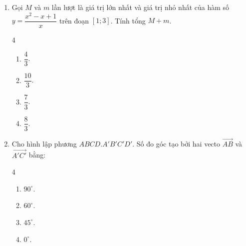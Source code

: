 \documentclass[12pt]{article}
\begin{document}
\begin{enumerate}[label=\textbf{Câu \arabic*.}, leftmargin=*]
		\item Gọi $M$ và $m$ lần lượt là giá trị lớn nhất và giá trị nhỏ nhất của hàm số $y = \dfrac{x^2 - x + 1}{x}$ trên đoạn $[1; 3]$. Tính tổng $M + m$.
		\begin{multicols}{4}
			\begin{enumerate}[label=\Alph*.]
				\item $\dfrac{4}{3}$.
				\item $\dfrac{10}{3}$.
				\item $\dfrac{7}{3}$.
				\item $\dfrac{8}{3}$.
			\end{enumerate}
		\end{multicols}
		
		\item Cho hình lập phương $ABCD.A'B'C'D'$. Số đo góc tạo bởi hai vecto $\overrightarrow{AB}$ và $\overrightarrow{A'C'}$ bằng:
		\begin{multicols}{4}
			\begin{enumerate}[label=\Alph*.]
				\item $90^\circ$.
				\item $60^\circ$.
				\item $45^\circ$.
				\item $0^\circ$.
			\end{enumerate}
		\end{multicols}
		
	\end{enumerate}
	
\end{document}
